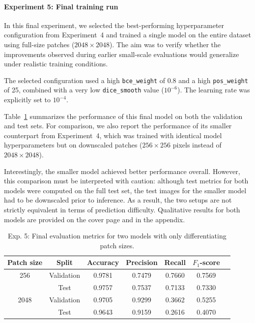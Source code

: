 \documentclass[12pt]{article}
\begin{document}
\paragraph{Experiment 5: Final training run}  
In this final experiment, we selected the best-performing hyperparameter configuration from Experiment~4 and trained a single model on the entire dataset using full-size patches ($2048 \times 2048$). The aim was to verify whether the improvements observed during earlier small-scale evaluations would generalize under realistic training conditions.

The selected configuration used a high \texttt{bce\_weight} of 0.8 and a high \texttt{pos\_weight} of 25, combined with a very low \texttt{dice\_smooth} value ($10^{-6}$). The learning rate was explicitly set to $10^{-4}$.



Table~\ref{tab:exp5_metrics} summarizes the performance of this final model on both the validation and test sets. For comparison, we also report the performance of its smaller counterpart from Experiment~4, which was trained with identical model hyperparameters but on downscaled patches ($256 \times 256$ pixels instead of $2048 \times 2048$).

Interestingly, the smaller model achieved better performance overall. However, this comparison must be interpreted with caution: although test metrics for both models were computed on the full test set, the test images for the smaller model had to be downscaled prior to inference. As a result, the two setups are not strictly equivalent in terms of prediction difficulty. Qualitative results for both models are provided on the cover page and in the appendix.

\begin{table}[t]
    \centering
    \begin{tabular}{c|c|ccccc}
        \toprule
        Patch size & Split & Accuracy & Precision & Recall & $F_1$-score \\
        \midrule
        256 & Validation & 0.9781 & 0.7479 & 0.7660 & 0.7569 \\
          & Test       & 0.9757 & 0.7537 & 0.7133 & 0.7330 \\
        \midrule
        2048 & Validation & 0.9705 & 0.9299 & 0.3662 & 0.5255 \\
          & Test       & 0.9643 & 0.9159 & 0.2616 & 0.4070 \\
        \bottomrule
    \end{tabular}
    \caption{Exp. 5: Final evaluation metrics for two models with only differentiating patch sizes.}
    \label{tab:exp5_metrics}
\end{table}
\end{document}

